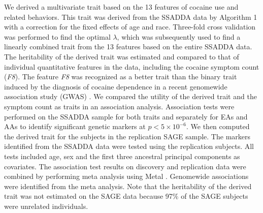 \documentclass[10pt,letterpaper]{article}
\begin{document}
We derived a multivariate trait based on the 13 features of cocaine use and related behaviors. This trait was derived from the SSADDA data by Algorithm 1 with a correction for the fixed effects of age and race. Three-fold cross validation was performed to find the optimal $\lambda$, which was subsequently used to find a linearly combined trait from the 13 features based on the entire SSADDA data. The heritability of the derived trait was estimated and compared to that of individual quantitative features in the data, including the cocaine symptom count ({\em F8}). The feature {\em F8} was recognized as a better trait than the binary trait induced by the diagnosis of cocaine dependence in a recent genomewide association study (GWAS) \cite{Gelernter:CD:2014}. We compared the utility of the derived trait and the symptom count as traits in an association analysis. Association tests were performed on the SSADDA sample for both traits and separately for EAs and AAs to identify significant genetic markers at $p < 5\times 10^{-6}$. We then computed the derived trait for the subjects in the replication SAGE sample. The markers identified from the SSADDA data were tested using the replication subjects. All tests included age, sex and the first three ancestral principal components as covariates. The association test results on discovery and replication data were combined by performing meta analysis using Metal \cite{metal:2010}. Genomewide associations were identified from the meta analysis. Note that the heritability of the derived trait was not estimated on the SAGE data because 97\% of the SAGE subjects were unrelated individuals.
\end{document}

